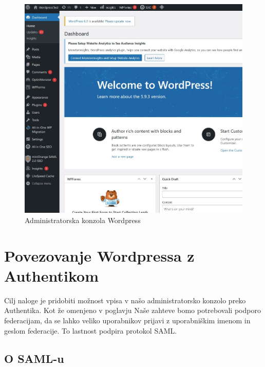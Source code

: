 \documentclass[a4paper,12pt,openright]{book}
\begin{document}
{\begin{figure}[H]
\hspace{-2cm}
\includegraphics[scale=0.7]{diploma-FRI-vzorec_11maj2021/Screenshot_1.jpg}
\caption{Administratorska konzola Wordpress}
\label{fig:adminWord}
\end{figure}

\section{Povezovanje Wordpressa z Authentikom}

Cilj naloge je pridobiti možnost vpisa v našo administratorsko konzolo preko Authentika. Kot že omenjeno v poglavju Naše zahteve bomo potrebovali podporo federacijam, da se lahko veliko uporabnikov prijavi z uporabniškim imenom in geslom federacije. To lastnost podpira protokol SAML.

\subsection{O SAML-u}

}
\end{document}
